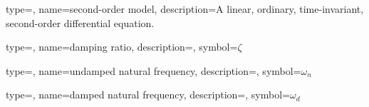 {
type=\thisgls,
name=second-order model,
description={A linear, ordinary, time-invariant, second-order differential equation.}
}

{
type=\thisgls,
name=damping ratio,
description={},
symbol={$\zeta$}
}

{
type=\thisgls,
name=undamped natural frequency,
description={},
symbol={$\omega_n$}
}

{
type=\thisgls,
name=damped natural frequency,
description={},
symbol={$\omega_d$}
}
